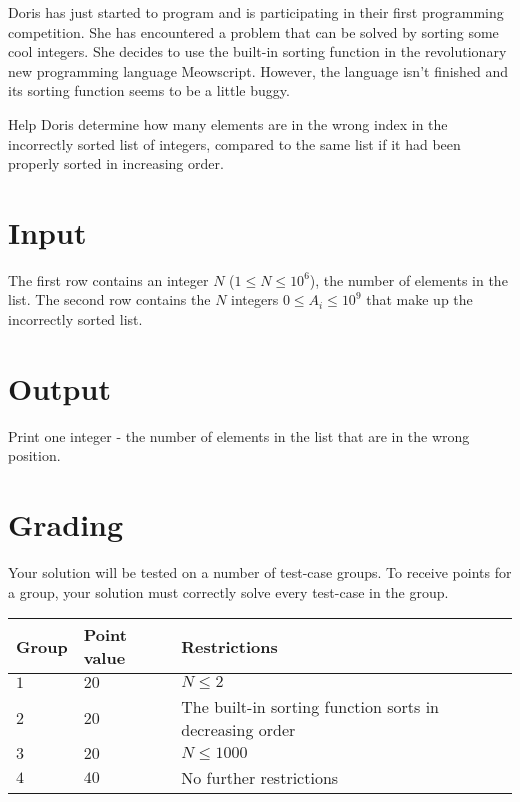 \noindent
Doris has just started to program and is participating in their first programming competition.
She has encountered a problem that can be solved by sorting some cool integers.
She decides to use the built-in sorting function in the revolutionary new programming language Meowscript.
However, the language isn't finished and its sorting function seems to be a little buggy.

\noindent
Help Doris determine how many elements are in the wrong index in the incorrectly sorted list of integers, compared to the same list if it had been properly sorted in increasing order.

\section*{Input}
\noindent
The first row contains an integer $N$ ($1\leq N \leq 10^6$), the number of elements in the list.
\noindent
The second row contains the $N$ integers $0\leq A_i \leq 10^9$ that make up the incorrectly sorted list.

\section*{Output}
\noindent
Print one integer - the number of elements in the list that are in the wrong position.
\section*{Grading}
\noindent
Your solution will be tested on a number of test-case groups.
\noindent
To receive points for a group, your solution must correctly solve every test-case in the group.

\noindent
\begin{tabular}{| l | l | l |}
\hline
  Group & Point value & Restrictions \\ \hline
  $1$    & $20$       &  $N \leq 2$  \\ \hline 
  $2$    & $20$       &  The built-in sorting function sorts in decreasing order \\ \hline 
  $3$    & $20$       &  $N \leq 1000$ \\ \hline
  $4$    & $40$       &  No further restrictions \\ \hline
\end{tabular}
